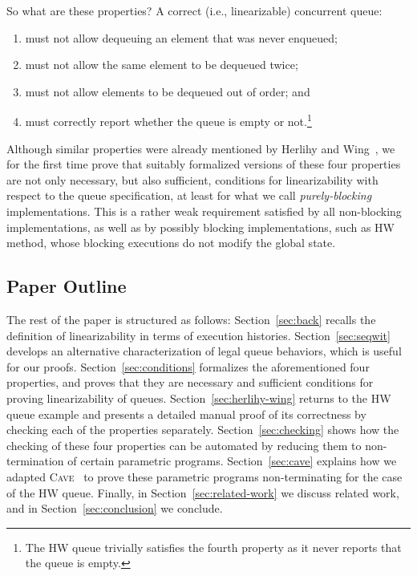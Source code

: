 \documentclass{LMCS}
\begin{document}
So what are these properties?  A correct (i.e., linearizable)
concurrent queue:
\begin{enumerate}
\item must not allow dequeuing an element that was never enqueued;
\item must not allow the same element to be dequeued twice;
\item must not allow elements to be dequeued out of order; and
\item must correctly report whether the queue is empty or not.\footnote{The HW queue trivially satisfies the fourth property as it never reports
that the queue is empty.}
\end{enumerate}

Although similar properties were already mentioned by Herlihy and Wing~\cite{HW1990}, 
we for the first time prove that suitably formalized versions of these four properties
are not only necessary, but also sufficient, conditions for linearizability 
with respect to the queue specification, at least for what we call 
\emph{purely-blocking} implementations.
This is a rather weak requirement satisfied by all non-blocking implementations,
as well as by possibly blocking implementations, such as HW  method, whose
blocking executions do not modify the global state.


\subsection*{Paper Outline}

The rest of the paper is structured as follows:
Section~\ref{sec:back} recalls the definition of linearizability in terms of execution histories.
Section~\ref{sec:seqwit} develops an alternative characterization of legal queue behaviors, which is useful for our proofs.
Section~\ref{sec:conditions} formalizes the aforementioned four properties, and proves that they are necessary and sufficient conditions for proving linearizability of queues.
Section~\ref{sec:herlihy-wing} returns to the HW queue example and presents a detailed manual proof of its correctness by checking each of the properties separately.
Section~\ref{sec:checking} shows how the checking of these four properties can be automated by reducing them to non-termination of certain parametric programs.
Section~\ref{sec:cave} explains how we adapted \textsc{Cave}~\cite{Vaf2010} to prove these parametric programs non-terminating for the case of the HW queue.
Finally, in Section~\ref{sec:related-work} we discuss related work, and in Section~\ref{sec:conclusion} we conclude.
\end{document}
